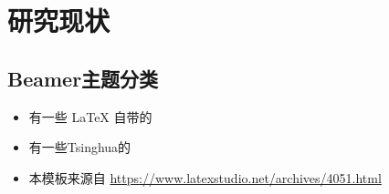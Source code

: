 \section{研究现状}

\subsection{Beamer主题分类}

\begin{frame}
	\begin{itemize}
		\item 有一些 \LaTeX{} 自带的
		\item 有一些Tsinghua的
		\item 本模板来源自 \newline \url{https://www.latexstudio.net/archives/4051.html}
	\end{itemize}
\end{frame}
